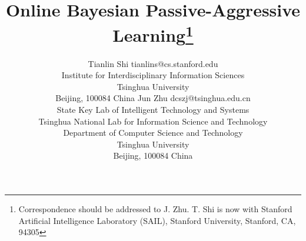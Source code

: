 \documentclass[twoside,11pt]{article}
\begin{document}
\title{Online Bayesian Passive-Aggressive Learning\thanks{Correspondence should be addressed to J. Zhu. T. Shi is now with Stanford Artificial Intelligence Laboratory (SAIL), Stanford University, Stanford, CA, 94305}}

\author{\name Tianlin Shi \email tianlins@cs.stanford.edu \\
       \addr Institute for Interdisciplinary Information Sciences\\
       Tsinghua University \\
       Beijing, 100084 China
       \AND
       \name Jun Zhu \email dcszj@tsinghua.edu.cn \\
       \addr State Key Lab of Intelligent Technology and Systems \\
       \addr Tsinghua National Lab for Information Science and Technology \\
       \addr Department of Computer Science and Technology\\
       Tsinghua University \\
       Beijing, 100084 China}


\maketitle
\end{document}
